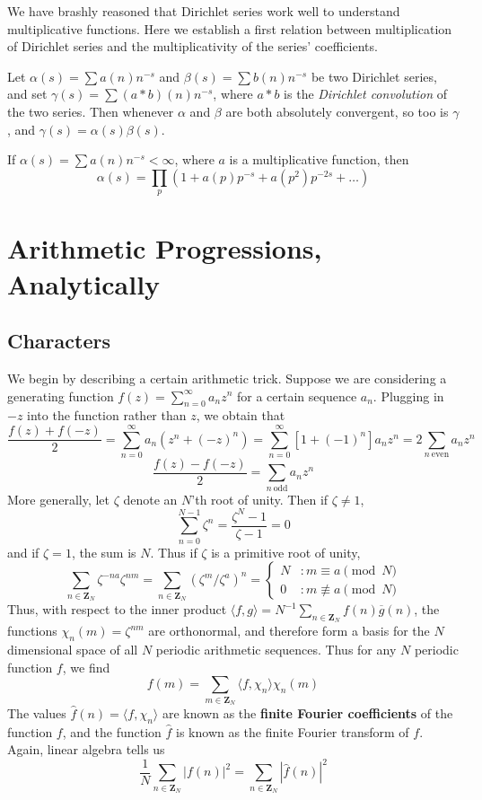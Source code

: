 We have brashly reasoned that Dirichlet series work well to understand multiplicative functions. Here we establish a first relation between multiplication of Dirichlet series and the multiplicativity of the series' coefficients.

\begin{theorem}
    Let $\alpha(s) = \sum a(n) n^{-s}$ and $\beta(s) = \sum b(n) n^{-s}$ be two Dirichlet series, and set $\gamma(s) = \sum (a * b)(n) n^{-s}$, where $a * b$ is the {\it Dirichlet convolution} of the two series. Then whenever $\alpha$ and $\beta$ are both absolutely convergent, so too is $\gamma$, and $\gamma(s) = \alpha(s) \beta(s)$.
\end{theorem}

\begin{theorem}
    If $\alpha(s) = \sum a(n) n^{-s} < \infty$, where $a$ is a multiplicative function, then
    \[ \alpha(s) = \prod_p \left( 1 + a(p) p^{-s} + a(p^2) p^{-2s} + \dots \right) \]
\end{theorem}

\chapter{Arithmetic Progressions, Analytically}

\section{Characters}

We begin by describing a certain arithmetic trick. Suppose we are considering a generating function $f(z) = \sum_{n = 0}^\infty a_n z^n$ for a certain sequence $a_n$. Plugging in $-z$ into the function rather than $z$, we obtain that
%
\[ \frac{f(z) + f(-z)}{2} = \sum_{n = 0}^\infty a_n (z^n + (-z)^n) = \sum_{n = 0}^\infty [1 + (-1)^n] a_n z^n = 2 \sum_{n\ \text{even}} a_n z^n \]
\[ \frac{f(z) - f(-z)}{2} = \sum_{n\ \text{odd}} a_n z^n \]
%
More generally, let $\zeta$ denote an $N$'th root of unity. Then if $\zeta \neq 1$,
%
\[ \sum_{n = 0}^{N-1} \zeta^n = \frac{\zeta^N - 1}{\zeta - 1} = 0 \]
%
and if $\zeta = 1$, the sum is $N$. Thus if $\zeta$ is a primitive root of unity,
%
\[ \sum_{n \in \mathbf{Z}_N} \zeta^{-na} \zeta^{nm} = \sum_{n \in \mathbf{Z}_N} (\zeta^m/\zeta^a)^n = \begin{cases} N &: m \equiv a \pmod N \\ 0 &: m \not \equiv a \pmod N \end{cases} \]
%
Thus, with respect to the inner product $\langle f, g \rangle = N^{-1} \sum_{n \in \mathbf{Z}_N} f(n) \overline{g}(n)$, the functions $\chi_n(m) = \zeta^{nm}$ are orthonormal, and therefore form a basis for the $N$ dimensional space of all $N$ periodic arithmetic sequences. Thus for any $N$ periodic function $f$, we find
%
\[ f(m) = \sum_{m \in \mathbf{Z}_N} \langle f, \chi_n \rangle \chi_n(m) \]
%
The values $\widehat{f}(n) = \langle f, \chi_n \rangle$ are known as the {\bf finite Fourier coefficients} of the function $f$, and the function $\widehat{f}$ is known as the finite Fourier transform of $f$. Again, linear algebra tells us
%
\[ \frac{1}{N} \sum_{n \in \mathbf{Z}_N} |f(n)|^2 = \sum_{n \in \mathbf{Z}_N} |\widehat{f}(n)|^2 \]
%


